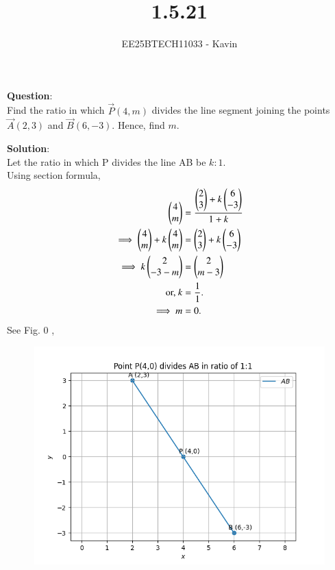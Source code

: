 \documentclass[journal]{IEEEtran}
\begin{document}

\vspace{3cm}

\title{1.5.21}
\author{EE25BTECH11033 - Kavin}
{\let\newpage\relax\maketitle}

\renewcommand{\thefigure}{\theenumi}
\renewcommand{\thetable}{\theenumi}
\setlength{\intextsep}{10pt} %
\textbf{Question}:\\
Find the ratio in which $\vec{P}(4,m)$ divides the line segment joining the points $\vec{A}(2,3)$ and $\vec{B}(6,-3)$. Hence, find $m$.\\
\bigskip


\textbf{Solution}:\\
Let the ratio in which P divides the line AB be $k:1$.\\
Using section formula,\\
\begin{align}
         \begin{pmatrix}4\\m\end{pmatrix} &=\frac{{\begin{pmatrix}2\\3\end{pmatrix}+k\begin{pmatrix}6\\-3\end{pmatrix}}}{1+k}\\
    \implies\begin{pmatrix}4\\m\end{pmatrix} + k\begin{pmatrix}4\\m\end{pmatrix} &=\begin{pmatrix}2\\3\end{pmatrix}+k\begin{pmatrix}6\\-3\end{pmatrix}\\ 
	 \implies k\begin{pmatrix}2 \\ -3-m\end{pmatrix} &= \begin{pmatrix}2 \\ m-3\end{pmatrix}
	 \\
	 \text{or, } k &= \frac{1}{1}.\\
     \implies m &= 0.
\end{align}
\bigskip
See Fig. 0 ,
\begin{figure}[H]
\begin{center}
\includegraphics[width=0.6\columnwidth]{figs/fig.png}
\end{center}
\caption{}
\label{fig:Fig1}
\end{figure}
\end{document}
